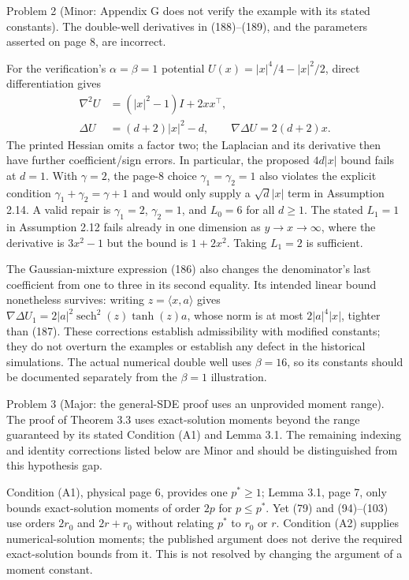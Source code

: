 \documentclass[10pt]{article}
\begin{document}
Problem 2 (Minor: Appendix G does not verify the example with its stated constants).  The double-well derivatives in (188)–(189), and the parameters asserted on page 8, are incorrect.\par
For the verification’s \(\alpha=\beta=1\) potential \(U(x)=|x|^4/4-|x|^2/2\), direct differentiation gives \[\begin{aligned}
 \nabla^2U&=(|x|^2-1)I+2xx^\top,\\
 \Delta U&=(d+2)|x|^2-d,\qquad
 \nabla\Delta U=2(d+2)x.\end{aligned}\] The printed Hessian omits a factor two; the Laplacian and its derivative then have further coefficient/sign errors. In particular, the proposed \(4d|x|\) bound fails at \(d=1\). With \(\gamma=2\), the page-8 choice \(\gamma_1=\gamma_2=1\) also violates the explicit condition \(\gamma_1+\gamma_2=\gamma+1\) and would only supply a \(\sqrt d|x|\) term in Assumption 2.14. A valid repair is \(\gamma_1=2\), \(\gamma_2=1\), and \(L_0=6\) for all \(d\ge1\). The stated \(L_1=1\) in Assumption 2.12 fails already in one dimension as \(y\to x\to\infty\), where the derivative is \(3x^2-1\) but the bound is \(1+2x^2\). Taking \(L_1=2\) is sufficient.\par
The Gaussian-mixture expression (186) also changes the denominator’s last coefficient from one to three in its second equality. Its intended linear bound nonetheless survives: writing \(z=\langle x,a\rangle\) gives \(\nabla\Delta U_1=2|a|^2\operatorname{sech}^2(z)\tanh(z)a\), whose norm is at most \(2|a|^4|x|\), tighter than (187). These corrections establish admissibility with modified constants; they do not overturn the examples or establish any defect in the historical simulations. The actual numerical double well uses \(\beta=16\), so its constants should be documented separately from the \(\beta=1\) illustration.\par
Problem 3 (Major: the general-SDE proof uses an unprovided moment range).  The proof of Theorem 3.3 uses exact-solution moments beyond the range guaranteed by its stated Condition (A1) and Lemma 3.1. The remaining indexing and identity corrections listed below are Minor and should be distinguished from this hypothesis gap.\par
Condition (A1), physical page 6, provides one \(p^*\ge1\); Lemma 3.1, page 7, only bounds exact-solution moments of order \(2p\) for \(p\le p^*\). Yet (79) and (94)–(103) use orders \(2r_0\) and \(2r+r_0\) without relating \(p^*\) to \(r_0\) or \(r\). Condition (A2) supplies numerical-solution moments; the published argument does not derive the required exact-solution bounds from it. This is not resolved by changing the argument of a moment constant.\par
\end{document}
